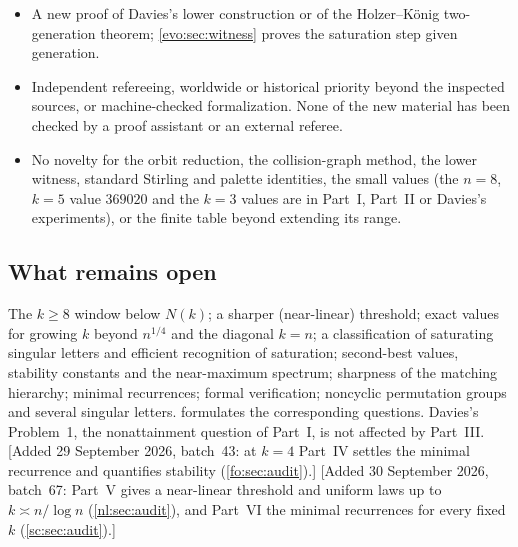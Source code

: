 \documentclass[11pt,a4paper]{article}
\numberwithin{equation}{section}
\theoremstyle{definition}
\theoremstyle{remark}
\begin{document}
\begin{itemize}
 breadth-first searches prove any infinite statement.
\item A new proof of Davies's lower construction or of the Holzer--K\"onig
 two-generation theorem; \cref{evo:sec:witness} proves the saturation step
 given generation.
\item Independent refereeing, worldwide or historical priority beyond the
 inspected sources, or machine-checked formalization. None of the new
 material has been checked by a proof assistant or an external referee.
\item No novelty for the orbit reduction, the collision-graph method, the
 lower witness, standard Stirling and palette identities, the small values
 (the $n=8$, $k=5$ value $369020$ and the $k=3$ values are in Part~I, Part~II
 or Davies's experiments), or the finite table beyond extending its range.
\end{itemize}

\subsection{What remains open}

The $k\ge8$ window below $N(k)$; a sharper (near-linear) threshold; exact
values for growing $k$ beyond $n^{1/4}$ and the diagonal $k=n$; a
classification of saturating singular letters and efficient recognition of
saturation; second-best values, stability constants and the near-maximum
spectrum; sharpness of the matching hierarchy; minimal recurrences; formal
verification; noncyclic permutation groups and several singular letters.
 formulates the corresponding questions. Davies's
Problem~1, the nonattainment question of Part~I, is not affected by Part~III.
[Added 29 September 2026, batch~43: at $k=4$ Part~IV settles the minimal
recurrence and quantifies stability (\cref{fo:sec:audit}).]
[Added 30 September 2026, batch~67: Part~V gives a near-linear threshold and uniform laws up
to $k\asymp n/\log n$ (\cref{nl:sec:audit}), and Part~VI the minimal
recurrences for every fixed $k$ (\cref{sc:sec:audit}).]
\end{document}
